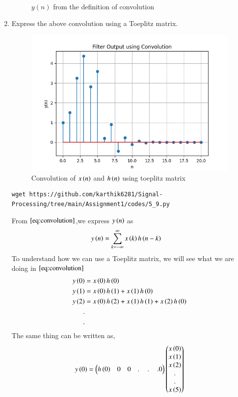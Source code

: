 \documentclass[journal,12pt,twocolumn]{IEEEtran}
\renewcommand\thesection{\arabic{section}}
\begin{document}
\begin{enumerate}[label=\thesection.\arabic*]
\begin{figure}[!ht]
		\caption{$y(n)$ from the definition of convolution}
		\label{fig:y_n_convo}
	\end{figure}
	  \item Express the above convolution using a Toeplitz matrix.\\
	\solution 
	\begin{figure}
		\centering
		\includegraphics[width = \columnwidth]{figs/5_9.png}
		\caption{Convolution of $x\left(n\right)$ and $h\left(n\right)$ using toeplitz matrix}
		\label{5.9}
	\end{figure}
	\begin{lstlisting}
wget https://github.com/karthik6281/Signal-Processing/tree/main/Assignment1/codes/5_9.py
	\end{lstlisting}
	From $\eqref{eq:convolution}$,we express $y\left(n\right)$ as
	\begin{align}
		y\left(n\right) &= \sum_{k = -\infty}^{\infty}x\left(k\right)h\left(n-k\right)
	\end{align}
	To understand how we can use a Toeplitz matrix, we will see what we are doing in $\eqref{eq:convolution}$ 
	\begin{align}
		y\left(0\right) &= x\left(0\right)h\left(0\right)\\
		y\left(1\right) &= x\left(0\right)h\left(1\right) + x\left(1\right)h\left(0\right)\\
		y\left(2\right) &= x\left(0\right)h\left(2\right) + x\left(1\right)h\left(1\right) + x\left(2\right)h\left(0\right)\\
		. \nonumber&\\ 
		.& \nonumber
	\end{align}
	The same thing can be written as,
	\begin{align}
		y\brak{0} &= \myvec{h\brak{0} & 0 & 0 &.\,&.\,&.0}\myvec{x\brak{0}\\x\brak{1}\\x\brak{2}\\ . \\.\\x\brak{5}}\\

\end{align}
\end{enumerate}
\end{document}
